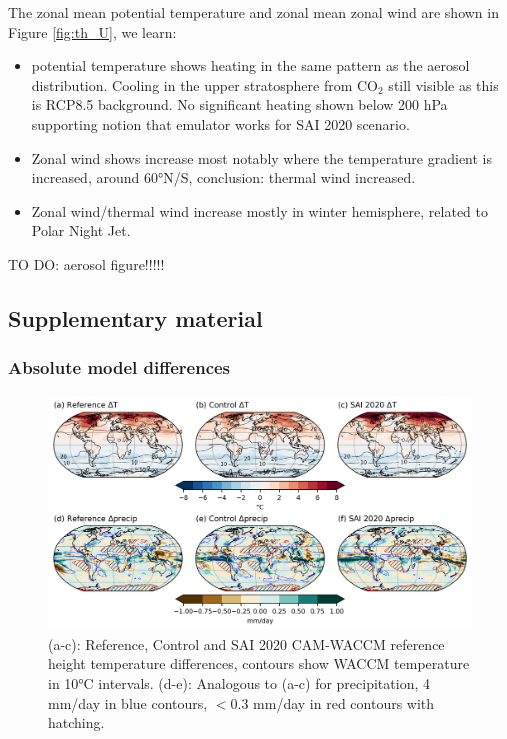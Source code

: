 The zonal mean potential temperature and zonal mean zonal wind are shown in Figure \ref{fig:th_U}, we learn:

\begin{itemize}
	\item potential temperature shows heating in the same pattern as the aerosol distribution. Cooling in the upper stratosphere from CO$_2$ still visible as this is RCP8.5 background. No significant heating shown below 200 hPa supporting notion that emulator works for SAI 2020 scenario. 
	\item Zonal wind shows increase most notably where the temperature gradient is increased, around 60°N/S, conclusion: thermal wind increased.
	\item Zonal wind/thermal wind increase mostly in winter hemisphere, related to Polar Night Jet. 
\end{itemize}

TO DO: aerosol figure!!!!!

\subsection{Supplementary material}

\subsubsection{Absolute model differences}
\begin{figure}[H]
	\centering
	\includegraphics[width=\linewidth]{../Paper_imgs/CAM_WACCM.png}
	\caption{(a-c): Reference, Control and SAI 2020 CAM-WACCM reference height temperature differences, contours show WACCM temperature in 10°C intervals. (d-e): Analogous to (a-c) for precipitation, 4 mm/day in blue contours, $<0.3$ mm/day in red contours with hatching.}
	\label{fig:abs_diff}
\end{figure}

